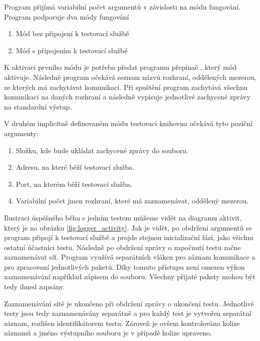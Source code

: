 Program přijímá variabilní počet argumentů v závislosti na módu fungování. Program podporuje dva módy fungování

\begin{enumerate}
    \item Mód bez připojení k testovací službě
    \item Mód s připojením k testovací službě
\end{enumerate}

K aktivaci prvního módu je potřeba předat programu přepínač , který mód aktivuje. Následně program očekává seznam názvů rozhraní, oddělených mezerou, ze kterých má zachytávat komunikaci. Při spuštění program zachytává všechnu komunikaci na daných rozhraní a následně vypisuje jednotlivé zachycené zprávy na standardní výstup.

V druhém implicitně definovaném módu testovací knihovna očekává tyto poziční argumenty:

\begin{enumerate}
    \item Složku, kde bude ukládat zachycené zprávy do souboru.
    \item Adresu, na které běží testovací služba.
    \item Port, na kterém běží testovací služba.
    \item Variabilní počet jmen rozhraní, které má zaznamenávat, oddělený mezerou.
\end{enumerate}

Ilustraci úspěšného běhu s jedním testem můžeme vidět na diagramu aktivit, který je na obrázku \ref{fig:logger_activity}. Jak je vidět, po obdržení argumentů se program připojí k testovací službě a projde stejnou inicializační fází, jako všichni ostatní účastníci testu. Následně po obdržení zprávy o započnutí testu začne zaznamenávat síť. Program využívá separátních vláken pro záznam komunikace a pro zpracovaní jednotlivých paketů. Díky tomuto přístupu není omezen výkon zaznamenávání například zápisem do souboru. Všechny přijaté pakety mohou být tedy ihned zapsány. 

Zaznamenávání sítě je ukončeno při obdržení zprávy o ukončení testu. Jednotlivé testy jsou tedy zaznamenávány separátně a pro každý test je vytvořen separátní záznam, rozlišen identifikátorem testu. Zároveň je ovšem kontrolována kolize záznamů a jméno výstupního souboru je v případě kolize upraveno. 

